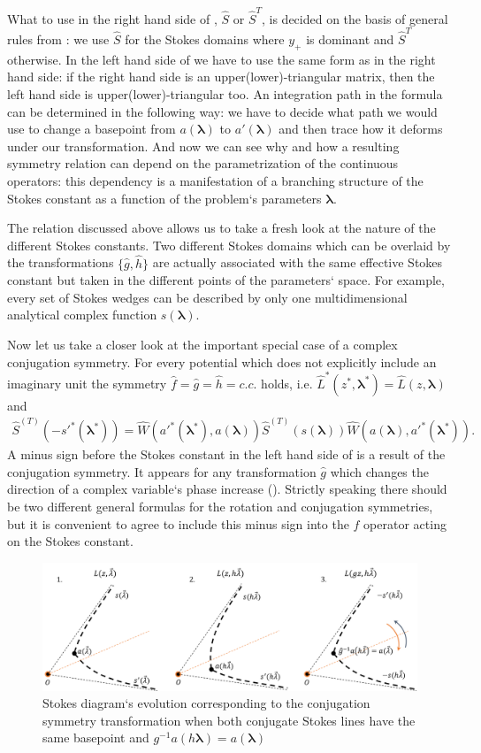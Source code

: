 \documentclass[12pt]{iopart}
\def\S{\hat{S}}
\def\W{\hat{W}}
\def\f{\hat{f}}
\def\g{\hat{g}}
\def\h{\hat{h}}
\def\L{\hat{L}}
\def\lmbd{\bm{\lambda}}
\begin{document}
What to use in the right hand side of , $\S$ or $\S^T$, is decided on the basis of general rules from : we use $\S$ for the Stokes domains where $y_+$ is dominant and $\S^T$ otherwise. In the left hand side of  we have to use the same form as in the right hand side: if the right hand side is an upper(lower)-triangular matrix, then the left hand side is upper(lower)-triangular too. An integration path in the formula can be determined in the following way: we have to decide what path we would use to change a basepoint from $a(\lmbd)$ to $a'(\lmbd)$ and then trace how it deforms under our transformation. And now we can see why and how a resulting symmetry relation can depend on the parametrization of the continuous operators: this dependency is a manifestation of a branching structure of the Stokes constant as a function of the problem`s parameters $\lmbd$.

The relation discussed above allows us to take a fresh look at the nature of the different Stokes constants. Two different Stokes domains which can be overlaid by the transformations $\{\g,\h\}$ are actually associated with the same effective Stokes constant but taken in the different points of the parameters` space. For example, every set of Stokes wedges can be described by only one multidimensional analytical complex function $s(\lmbd)$.

Now let us take a closer look at the important special case of a complex conjugation symmetry. For every potential which does not explicitly include an imaginary unit the symmetry $\f=\g=\h=c.c.$ holds, 
i.e. $\L^*(z^*,\lmbd^*)=\L(z,\lmbd)$ and
\begin{eqnarray}
\S^{(T)} \left( -s'^*(\lmbd^*) \right) = 
\W \left( a'^*(\lmbd^*),a(\lmbd) \right)
\S^{(T)} \left( s(\lmbd) \right)
\W \left( a(\lmbd),a'^*(\lmbd^*) \right).
\label{eq:cnjgtn}
\end{eqnarray}
A minus sign before the Stokes constant in the left hand side of  is a result of the conjugation symmetry. It appears for any transformation $\g$ which changes the direction of a complex variable`s phase increase (). Strictly speaking there should be two different general formulas for the rotation and conjugation symmetries, but it is convenient to agree to include this minus sign into the $\f$ operator acting on the Stokes constant.

\begin{figure}
\centering
\noindent
\includegraphics[scale=.5]{stuff/cs.png}
\caption{Stokes diagram`s evolution corresponding to the conjugation symmetry transformation when both conjugate Stokes lines have the same basepoint and $g^{-1}a(h\lmbd)=a(\lmbd)$}
\label{fig:cst}
\end{figure} 
\end{document}
